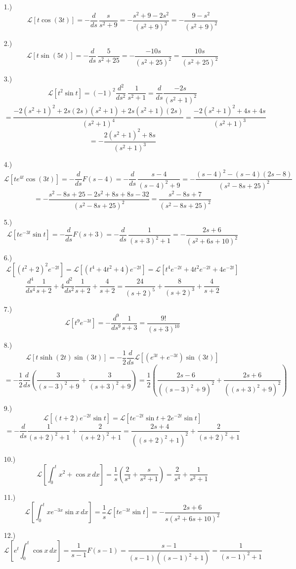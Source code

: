 \documentclass[12pt]{article}
\newcommand{\bracks}[1]{\left[#1\right]}
\newcommand{\parns}[1]{\left(#1\right)}
\newcommand{\lp}{\mathcal{L}}
\begin{document}
\pagestyle{fancy}
\fancyhead{}

\normalsize
\begin{itemize}
    \item [1.)] \[\lp\bracks{t\cos(3t)}=-\frac{d}{ds}\,\frac{s}{s^2+9}=-\frac{s^2+9-2s^2}{(s^2+9)^2}=-\frac{9-s^2}{(s^2+9)^2}\]

    \item [2.)] \[\lp\bracks{t\sin(5t)}=-\frac{d}{ds}\,\frac{5}{s^2+25}=-\frac{-10s}{(s^2+25)^2}=\frac{10s}{(s^2+25)^2}\]
    
    \item [3.)] \[\lp\bracks{t^2\sin t}=(-1)^2\frac{d^2}{ds^2}\,\frac{1}{s^2+1}=\frac{d}{ds}\frac{-2s}{(s^2+1)^2}\]
    \[=\frac{-2(s^2+1)^2+2s(2s)(s^2+1)+2s(s^2+1)(2s)}{(s^2+1)^4}=\frac{-2(s^2+1)^2+4s+4s}{(s^2+1)^3}\]
    \[=-\frac{2(s^2+1)^2+8s}{(s^2+1)^3}\]
    
    \item [4.)] \[\lp\bracks{te^{4t}\cos(3t)}=-\frac{d}{ds}F(s-4)=-\frac{d}{ds}\,\frac{s-4}{(s-4)^2+9}=-\frac{(s-4)^2-(s-4)(2s-8)}{(s^2-8s+25)^2}\]
    \[=-\frac{s^2-8s+25-2s^2+8s+8s-32}{(s^2-8s+25)^2}=\frac{s^2-8s+7}{(s^2-8s+25)^2}\]
    
    \item [5.)] \[\lp\bracks{te^{-3t}\sin t}=-\dfrac{d}{ds}F(s+3)=-\frac{d}{ds}\,\frac{1}{(s+3)^2+1}=-\frac{2s+6}{(s^2+6s+10)^2}\]
    
    \item [6.)] \[\lp\bracks{(t^2+2)^2e^{-2t}}=\lp\bracks{(t^4+4t^2+4)e^{-2t}}=\lp\bracks{t^4e^{-2t}+4t^2e^{-2t}+4e^{-2t}}\]
    \[\frac{d^4}{ds^4}\frac{1}{s+2}+4\frac{d^2}{ds^2}\frac{1}{s+2}+\frac{4}{s+2}=\frac{24}{(s+2)^5}+\frac{8}{(s+2)^3}+\frac{4}{s+2}\]
    
    \item [7.)] \[\lp\bracks{t^9e^{-3t}}=-\frac{d^9}{ds^9}\frac{1}{s+3}=\frac{9!}{(s+3)^{10}}\]
    
    \item [8.)] \[\lp\bracks{t\sinh(2t)\sin(3t)}=-\frac{1}{2}\frac{d}{ds}\lp\bracks{(e^{3t}+e^{-3t})\sin(3t)}\]
    \[=-\frac{1}{2}\frac{d}{ds}\parns{\frac{3}{(s-3)^2+9}+\frac{3}{(s+3)^2+9}}=\frac{1}{2}\parns{\frac{2s-6}{\parns{(s-3)^2+9}^2}+\frac{2s+6}{\parns{(s+3)^2+9}^2}}\]
    
    \item [9.)] \[\lp\bracks{(t+2)e^{-2t}\sin t}=\lp\bracks{te^{-2t}\sin t+2e^{-2t}\sin t}\]
    \[=-\dfrac{d}{ds}\frac{1}{(s+2)^2+1}+\frac{2}{(s+2)^2+1}=\frac{2s+4}{\parns{(s+2)^2+1}^2}+\frac{2}{(s+2)^2+1}\]
    
    \item [10.)] \[\lp\bracks{\int^t_0x^2+\cos x\,dx}=\frac{1}{s}\parns{\frac{2}{s^3}+\frac{s}{s^2+1}}=\frac{2}{s^4}+\frac{1}{s^2+1}\]
    
    \item [11.)] \[\lp\bracks{\int^t_0xe^{-3x}\sin x\,dx}=\frac{1}{s}\lp\bracks{te^{-3t}\sin t}=-\frac{2s+6}{s(s^2+6s+10)^2}\]
    
    \item [12.)] \[\lp\bracks{e^t\int^t_0\cos x\,dx}=\frac{1}{s-1}F(s-1)=\frac{s-1}{(s-1)((s-1)^2+1)}=\frac{1}{(s-1)^2+1}\]
    
\end{itemize}
\end{document}
